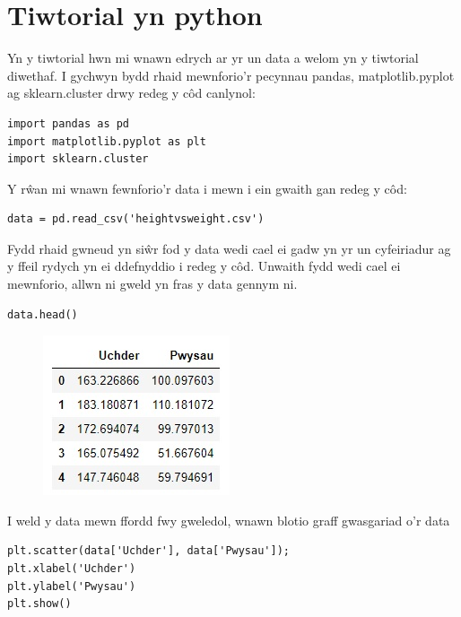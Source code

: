 

\section{Tiwtorial yn python}
Yn y tiwtorial hwn mi wnawn edrych ar yr un data a welom yn y tiwtorial diwethaf.
I gychwyn bydd rhaid mewnforio'r pecynnau pandas, matplotlib.pyplot ag sklearn.cluster drwy redeg y c\^{o}d canlynol:

\begin{verbatim}
import pandas as pd
import matplotlib.pyplot as plt
import sklearn.cluster
\end{verbatim}

Y r\^{w}an mi wnawn fewnforio'r data i mewn i ein gwaith gan redeg y c\^{o}d:
\begin{verbatim}
data = pd.read_csv('heightvsweight.csv')
\end{verbatim}
Fydd rhaid gwneud yn si\^{w}r fod y data wedi cael ei gadw yn yr un cyfeiriadur ag y ffeil rydych yn ei ddefnyddio i redeg y c\^{o}d.
Unwaith fydd wedi cael ei mewnforio, allwn ni gweld yn fras y data gennym ni. 
\begin{verbatim}
data.head()
\end{verbatim}

\begin{figure}
\includegraphics[width=0.35\linewidth]{../img/tabl1.jpg}
\label{fig:Data1}
\end{figure}

I weld y data mewn ffordd fwy gweledol, wnawn blotio graff gwasgariad o'r data

\begin{verbatim}
plt.scatter(data['Uchder'], data['Pwysau']);
plt.xlabel('Uchder')
plt.ylabel('Pwysau')
plt.show()
\end{verbatim}

